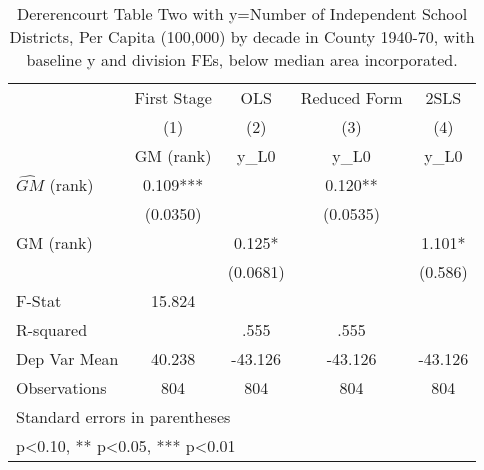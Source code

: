 \begin{table}[htbp]\centering
\def\sym#1{\ifmmode^{#1}\else\(^{#1}\)\fi}
\caption{Dererencourt Table Two with y=Number of Independent School Districts, Per Capita (100,000) by decade in County 1940-70, with baseline y and division FEs, below median area incorporated.}
\begin{tabular}{l*{4}{c}}
\toprule
                    & First Stage   &         OLS   &Reduced Form   &        2SLS   \\
                    &\multicolumn{1}{c}{(1)}&\multicolumn{1}{c}{(2)}&\multicolumn{1}{c}{(3)}&\multicolumn{1}{c}{(4)}\\
                    &\multicolumn{1}{c}{GM  (rank)}&\multicolumn{1}{c}{y\_L0}&\multicolumn{1}{c}{y\_L0}&\multicolumn{1}{c}{y\_L0}\\
\midrule
$\hat{GM}$ (rank)   &       0.109***&               &       0.120** &               \\
                    &    (0.0350)   &               &    (0.0535)   &               \\
\addlinespace
GM  (rank)          &               &       0.125*  &               &       1.101*  \\
                    &               &    (0.0681)   &               &     (0.586)   \\
\midrule
F-Stat              &      15.824   &               &               &               \\
R-squared           &               &        .555   &        .555   &               \\
Dep Var Mean        &      40.238   &     -43.126   &     -43.126   &     -43.126   \\
Observations        &         804   &         804   &         804   &         804   \\
\bottomrule
\multicolumn{5}{l}{\footnotesize Standard errors in parentheses}\\
\multicolumn{5}{l}{\footnotesize * p<0.10, ** p<0.05, *** p<0.01}\\
\end{tabular}
\end{table}
